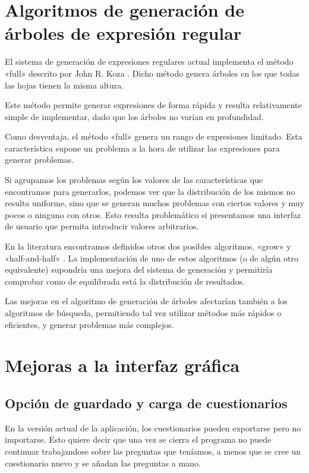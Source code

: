 
\section{Algoritmos de generación de árboles de expresión regular}
El sistema de generación de expresiones regulares actual implementa el método «full» descrito por John R. Koza \cite{koza92}.
Dicho método genera árboles en los que todas las hojas tienen la misma altura.

Este método permite generar expresiones de forma rápida y resulta relativamente simple de implementar, dado que los árboles no varían en profundidad.

Como desventaja, el método «full» genera un rango de expresiones limitado.
Esta característica supone un problema a la hora de utilizar las expresiones para generar problemas.

Si agrupamos los problemas según los valores de las características que encontramos para generarlos, podemos ver que la distribución de los mismos no resulta uniforme, sino que se generan muchos problemas con ciertos valores y muy pocos o ninguno con otros.
Esto resulta problemático si presentamos una interfaz de usuario que permita introducir valores arbitrarios.

En la literatura encontramos definidos otros dos posibles algoritmos, «grow» y «half-and-half» \cite{koza92}.
La implementación de uno de estos algoritmos (o de algún otro equivalente) supondría una mejora del sistema de generación y permitiría comprobar como de equilibrada está la distribución de resultados.

Las mejoras en el algoritmo de generación de árboles afectarían también a los algoritmos de búsqueda, permitiendo tal vez utilizar métodos más rápidos o eficientes, y generar problemas más complejos.

\section{Mejoras a la interfaz gráfica}
\subsection{Opción de guardado y carga de cuestionarios}
En la versión actual de la aplicación, los cuestionarios pueden exportarse pero no importarse.
Esto quiere decir que una vez se cierra el programa no puede continuar trabajandose sobre las preguntas que teníamos, a menos que se cree un cuestionario nuevo y se añadan las preguntas a mano.

